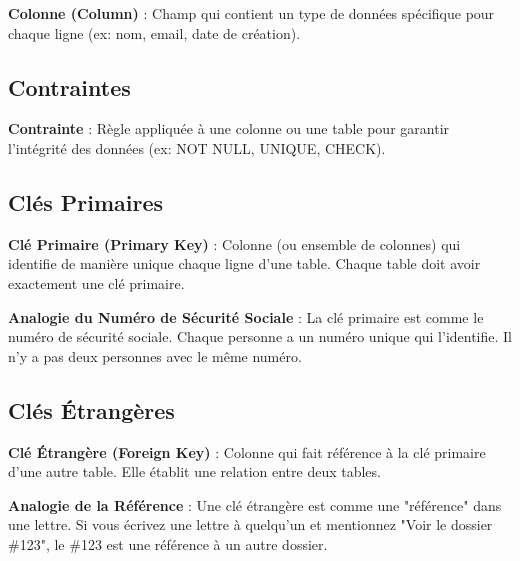 \begin{definitionbox}
    \textbf{Colonne (Column)} : Champ qui contient un type de données spécifique pour chaque ligne (ex: nom, email, date de création).
\end{definitionbox}

\subsection{Contraintes}

\begin{definitionbox}
    \textbf{Contrainte} : Règle appliquée à une colonne ou une table pour garantir l'intégrité des données (ex: NOT NULL, UNIQUE, CHECK).
\end{definitionbox}

\subsection{Clés Primaires}

\begin{definitionbox}
    \textbf{Clé Primaire (Primary Key)} : Colonne (ou ensemble de colonnes) qui identifie de manière unique chaque ligne d'une table. Chaque table doit avoir exactement une clé primaire.
\end{definitionbox}

\begin{analogybox}
    \textbf{Analogie du Numéro de Sécurité Sociale} : La clé primaire est comme le numéro de sécurité sociale. Chaque personne a un numéro unique qui l'identifie. Il n'y a pas deux personnes avec le même numéro.
\end{analogybox}

\subsection{Clés Étrangères}

\begin{definitionbox}
    \textbf{Clé Étrangère (Foreign Key)} : Colonne qui fait référence à la clé primaire d'une autre table. Elle établit une relation entre deux tables.
\end{definitionbox}

\begin{analogybox}
    \textbf{Analogie de la Référence} : Une clé étrangère est comme une "référence" dans une lettre. Si vous écrivez une lettre à quelqu'un et mentionnez "Voir le dossier \#123", le \#123 est une référence à un autre dossier.
\end{analogybox}

